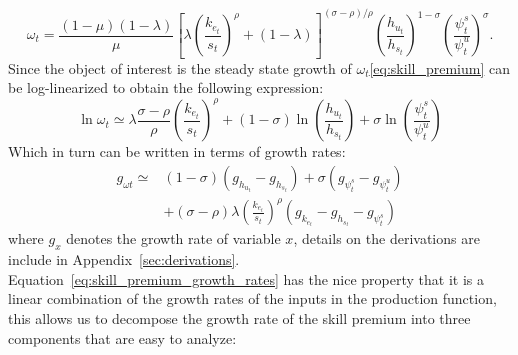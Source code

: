 \documentclass[12pt]{article}
\begin{document}
\begin{equation}\label{eq:skill_premium}
 \omega_{t}=\frac{(1-\mu)(1-\lambda)}{\mu}\left[\lambda\left(\frac{k_{e_t}}{s_{t}}\right)^{\rho}+(1-\lambda)\right]^{(\sigma-\rho) / \rho}\left(\frac{h_{u_t}}{h_{s_t}}\right)^{1-\sigma}\left(\frac{\psi^s_t}{\psi^u_t}\right)^{\sigma} .
\end{equation}
Since the object of interest is the steady state growth of $\omega_t$\eqref{eq:skill_premium} can be log-linearized to obtain the following expression:
\begin{equation}\label{eq:skill_premium_log_linear}
 \ln \omega_{t} \simeq \lambda \frac{\sigma-\rho}{\rho}\left(\frac{k_{e_t}}{s_{t}}\right)^{\rho}+(1-\sigma) \ln \left(\frac{h_{u_t}}{h_{s_t}}\right)+\sigma \ln \left(\frac{\psi^s_t}{\psi^u_t}\right)
\end{equation}
Which in turn can be written in terms of growth rates:
\begin{equation}\label{eq:skill_premium_growth_rates}
 \begin{aligned}
 g_{\omega t} \simeq &(1-\sigma)\left(g_{h_{u_t}}-g_{h_{s_t}}\right)+\sigma\left(g_{\psi^s_t}-g_{\psi^u_t}\right) \\
 &+(\sigma-\rho) \lambda\left(\frac{k_{e_t}}{s_{t}}\right)^{\rho}\left(g_{k_{e_t}}-g_{h_{s_t}}-g_{\psi^s_t}\right) 
 \end{aligned}
\end{equation}
where $g_x$ denotes the growth rate of variable $x$, details on the derivations are include in Appendix~\ref{sec:derivations}. Equation~\eqref{eq:skill_premium_growth_rates} has the nice property that it is a linear combination of the growth rates of the inputs in the production function, this allows us to decompose the growth rate of the skill premium into three components that are easy to analyze:
\end{document}
